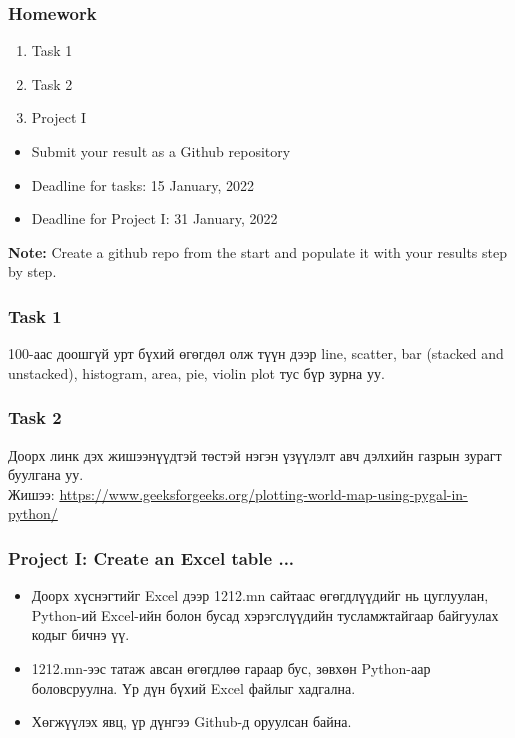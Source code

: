 \documentclass{beamer}
\begin{document}
\begin{frame}
    \frametitle{Homework}
    \begin{enumerate}
        \item Task 1
        \item Task 2
        \item Project I
    \end{enumerate}

    \vskip 2mm
    \begin{itemize}
        \item Submit your result as a Github repository
        \item Deadline for tasks: 15 January, 2022
        \item Deadline for Project I: 31 January, 2022 \\
    \end{itemize}

\vfill
\textbf{Note:} Create a github repo from the start and populate it with your results step by step.

\end{frame}

\begin{frame}
    \frametitle{Task 1}
    100-аас доошгүй урт бүхий өгөгдөл олж түүн дээр 
    line, scatter, bar (stacked and unstacked), histogram,
    area, pie, violin plot тус бүр зурна уу.
\end{frame}

\begin{frame}
    \frametitle{Task 2}
    Доорх линк дэх жишээнүүдтэй төстэй нэгэн үзүүлэлт
    авч дэлхийн газрын зурагт буулгана уу. \\
    Жишээ:
	\url{https://www.geeksforgeeks.org/plotting-world-map-using-pygal-in-python/}
\end{frame}

\begin{frame}
    \frametitle{Project I: Create an Excel table ...}
    \begin{itemize}
        \item Доорх хүснэгтийг Excel дээр 1212.mn сайтаас өгөгдлүүдийг нь цуглуулан, 
        Python-ий Excel-ийн болон бусад хэрэгслүүдийн тусламжтайгаар 
        байгуулах кодыг бичнэ үү. 
        \item 1212.mn-ээс татаж авсан өгөгдлөө гараар бус, зөвхөн Python-аар
        боловсруулна. Үр дүн бүхий Excel файлыг хадгална.
        \item Хөгжүүлэх явц, үр дүнгээ Github-д оруулсан байна.        
    \end{itemize}

\end{frame}
\end{document}
